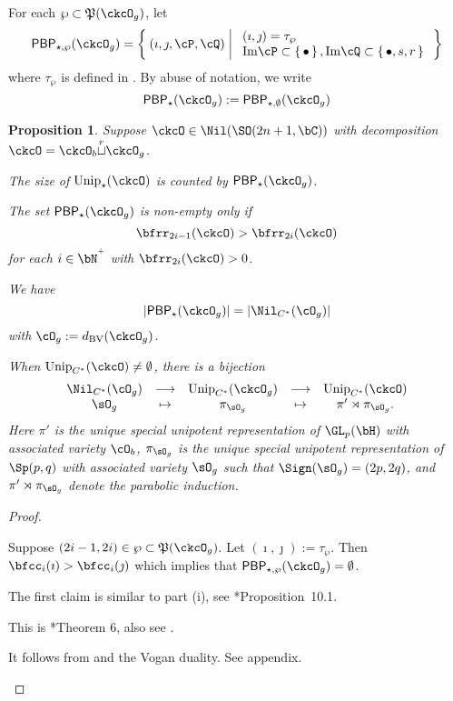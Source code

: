 \documentclass[12pt,a4paper]{amsart}
\def\Im{\operatorname{Im}}
\def\abs#1{\left|{#1}\right|}
\numberwithin{equation}{section}
\newtheorem{prop}[thm]{Proposition}
\theoremstyle{remark}
\def\Unip{\mathrm{Unip}}
\def\dBV{d_{\mathrm{BV}}}
\def\Im{\mathrm{Im}}
\def\cuprow{{\stackrel{r}{\sqcup}}}
\def\CPP{\mathfrak{P}}
\def\PBP{\mathsf{PBP}}
\def\sP{\wp}
\begin{document}
For each $\sP\subset \CPP(\ckcO_{g})$, let
\[
  \PBP_{\star,\sP}(\ckcO_g)= \Set{(\imath,\jmath,\cP,\cQ)| %
    \begin{array}{l}
      (\imath,\jmath) = \tau_{\sP}\\
      \Im \cP \subset \set{\bullet}, \Im \cQ \subset\set{\bullet, s,r}\\
    \end{array}
  }
\]
where $\tau_{\sP}$ is defined in .
By abuse of notation, we write
\[
\PBP_{\star}(\ckcO_g) :=\PBP_{\star,\emptyset}(\ckcO_g)
\]


\begin{prop}
  Suppose $\ckcO\in \Nil(\SO(2n+1,\bC))$ with decomposition
  $\ckcO = \ckcO_{b}\cuprow \ckcO_{g}$.
  \begin{enumT}
    \item The size of $\Unip_{\star}(\ckcO)$ is counted by
    $\PBP_{\star}(\ckcO_{g})$.
    \item The set $\PBP_{\star}(\ckcO_{g})$ is non-empty only if
    \[
      \bfrr_{2i-1}(\ckcO)> \bfrr_{2i}(\ckcO)
    \]
    for each $i\in \bN^{^{+}}$ with $\bfrr_{2i}(\ckcO)>0$.
    \item We have
    \[
      \abs{\PBP_{\star}(\ckcO_{g})} = \abs{\Nil_{C^{*}}(\cO_{g})}
    \]
    with $\cO_{g} := \dBV(\ckcO_{g})$.
    \item When $\Unip_{C^{*}}(\ckcO)\neq \emptyset$, there is a bijection
    \[
      \begin{array}{ccccc}
        \Nil_{C^{*}}(\cO_{g})& \longrightarrow & \Unip_{C^{*}}(\ckcO_{g})
        &\longrightarrow &\Unip_{C^{*}}(\ckcO) \\
        \sO_{g} & \mapsto & \pi_{\sO_{g}} & \mapsto
                         & \pi'\rtimes \pi_{\sO_{g}}.
      \end{array}
    \]
    Here $\pi'$ is the unique special unipotent representation of $\GL_p(\bH)$
    with associated variety $\cO_{b}$, $\pi_{\sO_{g}}$ is the unique special
    unipotent representation of $\Sp(p,q)$ with associated variety $\sO_{g}$
    such that $\Sign(\sO_{g}) = (2p,2q)$, and $\pi'\rtimes \pi_{\sO_{g}}$ denote
    the parabolic induction.
  \end{enumT}
\end{prop}
\begin{proof}
  \begin{enumPF}
    \item
    Suppose $(2i-1,2i)\in \sP\subset \CPP(\ckcO_{g})$.
    Let $(\imath,\jmath) :=\tau_{\sP}$. Then
    $\bfcc_{i}(\imath)>\bfcc_{i}(\jmath)$ which implies that
    $\PBP_{\star,\sP}(\ckcO_{g}) = \emptyset$.
    \item
    The first claim is similar to part (i), see \cite{BMSZ2}*{Proposition~10.1}.
    \item This is \cite{Mc}*{Theorem 6}, also see \cite{BMSZ2}.
    \item
    It follows from  and the Vogan duality.
    See appendix.
  \end{enumPF}
\end{proof}
\end{document}
